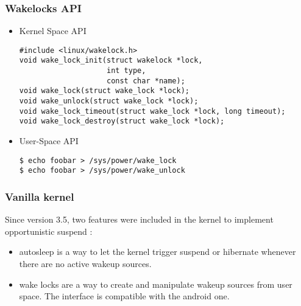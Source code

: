 \begin{frame}[fragile]
  \frametitle{Wakelocks API}
  \begin{itemize}
  \item Kernel Space API
\begin{verbatim}
#include <linux/wakelock.h>
void wake_lock_init(struct wakelock *lock,
                    int type,
                    const char *name);
void wake_lock(struct wake_lock *lock);
void wake_unlock(struct wake_lock *lock);
void wake_lock_timeout(struct wake_lock *lock, long timeout);
void wake_lock_destroy(struct wake_lock *lock);
\end{verbatim}
  \item User-Space API
\begin{verbatim}
$ echo foobar > /sys/power/wake_lock
$ echo foobar > /sys/power/wake_unlock
\end{verbatim}
\end{itemize}
\end{frame}

\begin{frame}
  \frametitle{Vanilla kernel}
  Since version 3.5, two features were included in the kernel to
  implement opportunistic suspend :
  \begin{itemize}
  \item autosleep is a way to let the kernel trigger suspend or
	  hibernate whenever there are no active wakeup sources.
  \item wake locks are a way to create and manipulate wakeup sources
	  from user space. The interface is compatible with the android
	  one.
  \end{itemize}
\end{frame}

